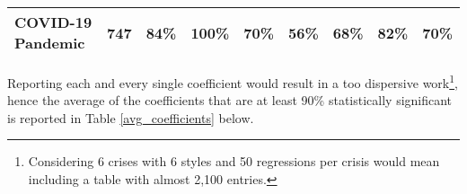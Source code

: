\documentclass[12pt]{article}
\begin{document}
\begin{table}[H]
{\begin{tabular}{@{}lcccccccc@{}}
COVID-19 Pandemic              & 747                                                                         & 84\%                                                                                 & 100\%                                                                             & 70\%                                                                                 & 56\%                                                                            & 68\%                                                                                & 82\%                                                                                      & 70\%                                                                               \\ \bottomrule
\end{tabular}}
\end{table}

Reporting each and every single coefficient would result in a too dispersive work\footnote{Considering 6 crises with 6 styles and 50 regressions per crisis would mean including a table with almost 2,100 entries.}, hence the average of the coefficients that are at least  90\% statistically significant is reported in Table \ref{avg_coefficients} below. \\

\begin{table}[H]
\caption{Average of the (at least) 90\% statistically significant coefficients.}
\label{avg_coefficients}
\end{table}
\end{document}
